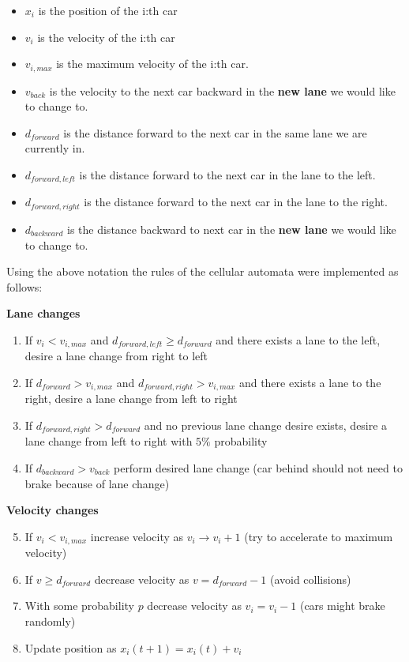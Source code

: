 \documentclass[a4paper,12pt]{article}
\begin{document}
\begin{itemize}
    \item $x_i$ is the position of the i:th car
    \item $v_i$ is the velocity of the i:th car
    \item $v_{i, max}$ is the maximum velocity of the i:th car.
    \item $v_{back}$ is the velocity to the next car backward in the \textbf{new lane} we would like to change to.
    \item $d_{forward}$ is the distance forward to the next car in the same lane we are currently in.
    \item $d_{forward, left}$ is the distance forward to the next car in the lane to the left.
    \item $d_{forward, right}$ is the distance forward to the next car in the lane to the right.
    \item $d_{backward}$ is the distance backward to next car in the \textbf{new lane} we would like to change to.
\end{itemize}

Using the above notation the rules of the cellular automata were implemented as follows:

\vspace{5pt}
\textbf{Lane changes}
\begin{enumerate}
    \item If $v_i<v_{i,max}$ and $d_{forward, left}\geq d_{forward}$ and there exists a lane to the left, desire a lane change from right to left
    \item If $d_{forward} > v_{i, max}$ and $d_{forward, right} > v_{i, max}$ and there exists a lane to the right, desire a lane change from left to right
    \item If $d_{forward, right} > d_{forward}$ and no previous lane change desire exists, desire a lane change from left to right with $5\%$ probability
    \item If $d_{backward} > v_{back}$ perform desired lane change (car behind should not need to brake because of lane change)
\end{enumerate}

\textbf{Velocity changes}
\begin{enumerate}
    \setcounter{enumi}{4}
    \item If $v_i<v_{i, max}$ increase velocity as $v_i \rightarrow v_i+1$ (try to accelerate to maximum velocity)
    \item If $v \geq d_{forward}$ decrease velocity as $v = d_{forward} - 1$ (avoid collisions)
    \item With some probability $p$ decrease velocity as $v_i=v_i-1$ (cars might brake randomly)
    \item Update position as $x_i(t+1) = x_i(t) + v_i$
\end{enumerate}
\end{document}

